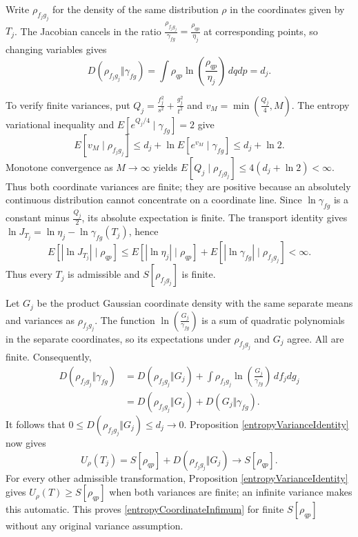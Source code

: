 \documentclass{techbrief}
\begin{document}
Write $\rho_{f_jg_j}$ for the density of the same distribution $\rho$ in the coordinates given by $T_j$. The Jacobian cancels in the ratio $\frac{\rho_{f_jg_j}}{\gamma_{fg}}=\frac{\rho_{qp}}{\eta_j}$ at corresponding points, so changing variables gives
\begin{equation*}
	D(\rho_{f_jg_j}\Vert\gamma_{fg})=\int\rho_{qp}\ln\left(\frac{\rho_{qp}}{\eta_j}\right)\,dqdp=d_j.
\end{equation*}

To verify finite variances, put $Q_j=\frac{f_j^2}{s^2}+\frac{g_j^2}{t^2}$ and $v_M=\min(\frac{Q_j}{4},M)$. The entropy variational inequality \cite[Theorem 3.3]{Rezakhanlou} and $E[e^{Q_j/4}\mid\gamma_{fg}]=2$ give
\begin{equation*}
	E[v_M\mid\rho_{f_jg_j}]\leq d_j+\ln E[e^{v_M}\mid\gamma_{fg}]\leq d_j+\ln2.
\end{equation*}
Monotone convergence as $M\to\infty$ yields $E[Q_j\mid\rho_{f_jg_j}]\leq4(d_j+\ln2)<\infty$. Thus both coordinate variances are finite; they are positive because an absolutely continuous distribution cannot concentrate on a coordinate line. Since $\ln\gamma_{fg}$ is a constant minus $\frac{Q_j}{2}$, its absolute expectation is finite. The transport identity gives $\ln J_{T_j}=\ln\eta_j-\ln\gamma_{fg}(T_j)$, hence
\begin{equation*}
	E[|\ln J_{T_j}|\mid\rho_{qp}]\leq E[|\ln\eta_j|\mid\rho_{qp}]+E[|\ln\gamma_{fg}|\mid\rho_{f_jg_j}]<\infty.
\end{equation*}
Thus every $T_j$ is admissible and $S[\rho_{f_jg_j}]$ is finite.

Let $G_j$ be the product Gaussian coordinate density with the same separate means and variances as $\rho_{f_jg_j}$. The function $\ln(\frac{G_j}{\gamma_{fg}})$ is a sum of quadratic polynomials in the separate coordinates, so its expectations under $\rho_{f_jg_j}$ and $G_j$ agree. All are finite. Consequently,
\begin{equation*}
	\begin{aligned}
		D(\rho_{f_jg_j}\Vert\gamma_{fg})
		&=D(\rho_{f_jg_j}\Vert G_j)+\int\rho_{f_jg_j}\ln\left(\frac{G_j}{\gamma_{fg}}\right)\,df_jdg_j\\
		&=D(\rho_{f_jg_j}\Vert G_j)+D(G_j\Vert\gamma_{fg}).
	\end{aligned}
\end{equation*}
It follows that $0\leq D(\rho_{f_jg_j}\Vert G_j)\leq d_j\to0$. Proposition \ref{entropyVarianceIdentity} now gives
\begin{equation*}
	U_\rho(T_j)=S[\rho_{qp}]+D(\rho_{f_jg_j}\Vert G_j)\longrightarrow S[\rho_{qp}].
\end{equation*}
For every other admissible transformation, Proposition \ref{entropyVarianceIdentity} gives $U_\rho(T)\geq S[\rho_{qp}]$ when both variances are finite; an infinite variance makes this automatic. This proves \eqref{entropyCoordinateInfimum} for finite $S[\rho_{qp}]$ without any original variance assumption.
\end{document}
